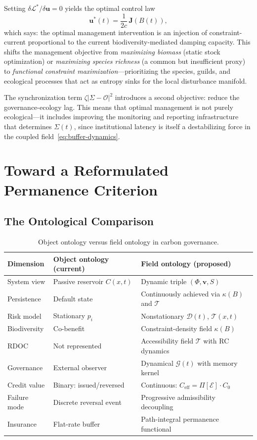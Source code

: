 \documentclass[12pt]{article}
\newcommand{\Ecal}{\mathcal{E}}
\newcommand{\Gcal}{\mathcal{G}}
\newcommand{\Lcal}{\mathcal{L}}
\newcommand{\Tcal}{\mathcal{T}}
\begin{document}
Setting $\delta\Lcal^*/\delta\mathbf{u}=0$ yields the optimal control law
\begin{equation}
\label{eq:optimal-control}
\mathbf{u}^*(t) = \frac{1}{2c}\,\mathbf{J}(B(t)),
\end{equation}
which says: the optimal management intervention is an injection of constraint-current
proportional to the current biodiversity-mediated damping capacity. This shifts the
management objective from \emph{maximizing biomass} (static stock optimization) or
\emph{maximizing species richness} (a common but insufficient proxy) to
\emph{functional constraint maximization}---prioritizing the species, guilds, and
ecological processes that act as entropy sinks for the local disturbance manifold.

The synchronization term $\zeta|\Sigma-\mathcal{O}|^2$ introduces a second objective:
reduce the governance-ecology lag. This means that optimal management is not purely
ecological---it includes improving the monitoring and reporting infrastructure that
determines $\Sigma(t)$, since institutional latency is itself a destabilizing force
in the coupled field~\eqref{eq:buffer-dynamics}.

\section{Toward a Reformulated Permanence Criterion}

\subsection{The Ontological Comparison}

\begin{table}[h]
\centering
\caption{Object ontology versus field ontology in carbon governance.}
\begin{tabular}{@{}p{2.8cm}p{5.3cm}p{5.7cm}@{}}
\toprule
\textbf{Dimension} & \textbf{Object ontology (current)} & \textbf{Field ontology (proposed)} \\
\midrule
System view & Passive reservoir $C(x,t)$ & Dynamic triple $(\Phi,\mathbf{v},S)$ \\
Persistence & Default state & Continuously achieved via $\kappa(B)$ and $\Tcal$ \\
Risk model & Stationary $p_i$ & Nonstationary $\mathcal{D}(t)$, $\Tcal(x,t)$ \\
Biodiversity & Co-benefit & Constraint-density field $\kappa(B)$ \\
RDOC & Not represented & Accessibility field $\Tcal$ with RC dynamics \\
Governance & External observer & Dynamical $\Gcal(t)$ with memory kernel \\
Credit value & Binary: issued/reversed & Continuous: $C_\text{eff}=\Pi[\Ecal]\cdot C_0$ \\
Failure mode & Discrete reversal event & Progressive admissibility decoupling \\
Insurance & Flat-rate buffer & Path-integral permanence functional \\
\bottomrule
\end{tabular}
\end{table}
\end{document}
